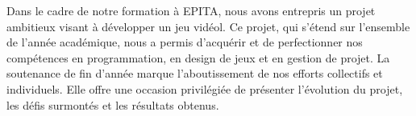 Dans le cadre de notre formation à EPITA, nous avons entrepris un projet ambitieux visant à développer un jeu vidéol. Ce projet, qui s'étend sur l'ensemble de l'année académique, nous a permis d'acquérir et de perfectionner nos compétences en programmation, en design de jeux et en gestion de projet. La soutenance de fin d'année marque l'aboutissement de nos efforts collectifs et individuels. Elle offre une occasion privilégiée de présenter l'évolution du projet, les défis surmontés et les résultats obtenus.
